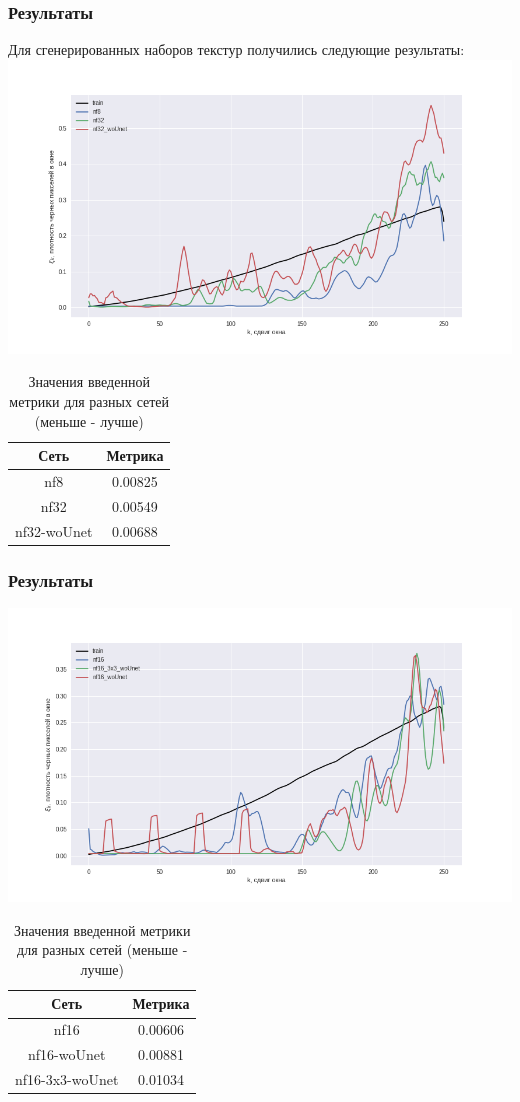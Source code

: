 \documentclass[12pt]{beamer}
\begin{document}
\begin{frame}\frametitle{Результаты}
	Для сгенерированных наборов текстур получились следующие результаты:
	\includegraphics[width=0.9\linewidth,height=0.3\textwidth]{tr_1}
	\begin{table}[h]
		\begin{tabular}{|c|c|}
			\hline
			Сеть & Метрика \\
			\hline
			nf8 & 0.00825\\
			\hline
			nf32 & 0.00549\\
			\hline
			nf32-woUnet & 0.00688\\
			\hline
		\end{tabular}
		\caption{Значения введенной метрики для разных сетей (меньше - лучше)}
	\end{table}
\end{frame}

\begin{frame}\frametitle{Результаты}
	\includegraphics[width=0.9\linewidth,height=0.3\textwidth]{tr_2}
	\begin{table}[h]
		\begin{tabular}{|c|c|}
			\hline
			Сеть & Метрика \\
			\hline
			nf16 & 0.00606\\
			\hline
			nf16-woUnet & 0.00881\\
			\hline
			nf16-3x3-woUnet & 0.01034\\
			\hline
		\end{tabular}
		\caption{Значения введенной метрики для разных сетей (меньше - лучше)}
	\end{table}
\end{frame}
\end{document}
